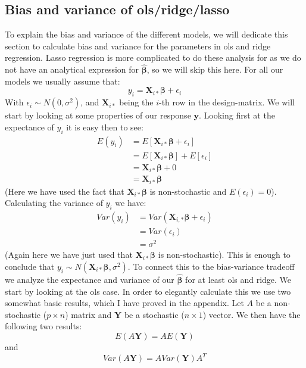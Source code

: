 \documentclass{article}
\begin{document}
\subsection{Bias and variance of ols/ridge/lasso}
To explain the bias and variance of the different models, we will dedicate this
section to calculate bias and variance for the parameters in ols and ridge
regression. Lasso regression is more complicated to do these analysis for as we
do not have an analytical expression for $\hat{\bm{\beta}}$, so we will skip
this here. For all our models we usually assume that:
$$y_i = \mathbf{X}_{i *} \bm{\beta} + \epsilon_i$$
With $\epsilon_i \sim N(0, \sigma^2)$, and $\mathbf{X}_{i *}$ being the $i$-th
row in the design-matrix. We will start by looking at some properties of our
response $\mathbf{y}$. Looking first at the expectance of $y_i$ it is easy then to
see:
\begin{align*}
    E(y_i) & = E\left[ \mathbf{X}_{i *} \bm{\beta} + \epsilon_i \right]                 \\
           & = E\left[ \mathbf{X}_{i *} \bm{\beta} \right] + E\left[ \epsilon_i \right] \\
           & = \mathbf{X}_{i *} \bm{\beta} + 0                                          \\
           & = \mathbf{X}_{i *}\bm{\beta}
\end{align*}
(Here we have used the fact that $\mathbf{X}_{i *} \bm{\beta}$ is
non-stochastic and $E(\epsilon_i) = 0$). Calculating the variance of $y_i$ we
have:
\begin{align*}
    Var(y_i) & = Var(\mathbf{X}_{i, *} \bm{\beta} + \epsilon_i) \\
             & = Var(\epsilon_i)                                \\
             & = \sigma^2
\end{align*}
(Again here we have just used that $\mathbf{X}_{i *} \mathbf{\beta}$ is non-stochastic).
This is enough to conclude that $y_i \sim N(\mathbf{X}_{i *} \mathbf{\beta},
    \sigma^2)$. To connect this to the bias-variance tradeoff we analyze the
expectance and variance of our $\hat{\bm{\beta}}$ for at least ols and ridge. We
start by looking at the ols case. In order to elegantly calculate this we use
two somewhat basic results, which I have proved in the appendix. Let
$A$ be a non-stochastic ($p\times n$) matrix and $\mathbf{Y}$ be a
stochastic ($n \times 1$) vector. We then have the following two results:
$$E(A \mathbf{Y}) = A E(\mathbf{Y})$$
and
$$Var(A \mathbf{Y}) = A Var(\mathbf{Y}) A^T$$
\end{document}
